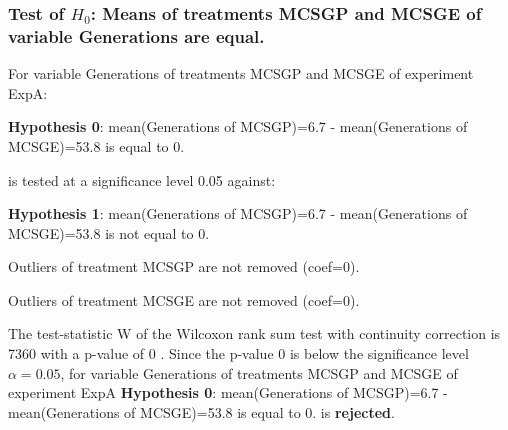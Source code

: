\begin{frame}[t]
 \frametitle{Test of $H_{0}$: Means of treatments MCSGP and MCSGE of variable Generations are equal. }
 \scriptsize
 For variable Generations of treatments MCSGP and MCSGE of experiment ExpA:

\vspace{1mm}
{\bf Hypothesis 0}: mean(Generations of MCSGP)=6.7 - mean(Generations of MCSGE)=53.8 is equal to 0.


 \begin{center} is tested at a significance level 0.05 against: \end{center}

{\bf Hypothesis 1}: mean(Generations of MCSGP)=6.7 - mean(Generations of MCSGE)=53.8 is not equal to 0.
\vspace{1mm}
\vspace{1mm}

 Outliers of treatment MCSGP  are not removed (coef=0).

 Outliers of treatment MCSGE  are not removed (coef=0).
\vspace{1mm}
 
 The test-statistic W of the Wilcoxon rank sum test with continuity correction is 7360 with a p-value of 0 .
 Since the p-value 0 is below the significance level $\alpha= 0.05 $,
 for variable Generations of treatments MCSGP and MCSGE of experiment ExpA 
 {\bf Hypothesis 0}: mean(Generations of MCSGP)=6.7 - mean(Generations of MCSGE)=53.8 is equal to 0.
is {\bf rejected}.

 \end{frame}
